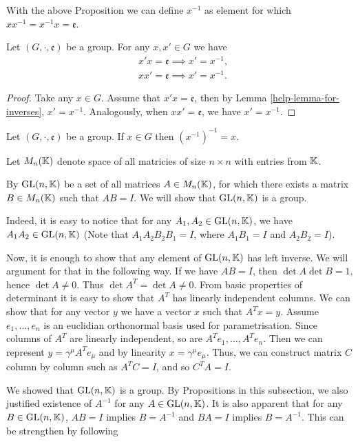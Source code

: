 \documentclass[main.tex]{subfiles}
\begin{document}
With the above Proposition we can define $x^{-1}$ as element for which $xx^{-1} = x^{-1} x = \mathfrak{e}$.

\begin{proposition}
Let $(G, \cdot, \mathfrak{e})$ be a group. For any $x, x'\in G$ we have
\begin{align}
& x'x = \mathfrak{e} \implies x' = x^{-1},\\
& xx' = \mathfrak{e} \implies x' = x^{-1}.
\end{align}
\end{proposition}
\begin{proof}
Take any $x\in G$. Assume that $x' x = \mathfrak{e}$, then by Lemma \ref{help-lemma-for-inverses}, $x' = x^{-1}$. Analogously, when $x x' = \mathfrak{e}$, we have $x' = x^{-1}$.
\end{proof}

\begin{corollary}
\label{group-invers-of-invers}
Let $(G, \cdot, \mathfrak{e})$ be a group. If $x\in G$ then $(x^{-1})^{-1} = x$.
\end{corollary}
Let $M_n(\mathbb{K})$ denote space of all matricies of size $n\times n$ with entries from $\mathbb{K}$.

By $\text{GL}(n, \mathbb{K})$ be a set of all matrices $A \in M_n(\mathbb{K})$, for which there exists a matrix $B\in M_n(\mathbb{K})$ such that $AB = I$. We will show that $\text{GL}(n, \mathbb{K})$ is a group.

Indeed, it is easy to notice that for any $A_1, A_2\in \text{GL}(n, \mathbb{K})$, we have $A_1A_2\in \text{GL}(n, \mathbb{K})$ (Note that $A_1 A_2 B_2 B_1 = I$, where $A_1B_1 = I$ and $A_2B_2 = I$).

Now, it is enough to show that any element of $\text{GL}(n, \mathbb{K})$ has left inverse. We will argument for that in the following way. If we have $AB = I$, then $\det A \det B = 1$, hence $\det A\not = 0$. Thus $\det A^T = \det A \not = 0$. From basic properties of determinant it is easy to show that $A^T$ has linearly independent columns. We can show that for any vector $y$ we have a vector $x$ such that $A^T x = y$. Assume $e_1, \dots, e_n$ is an euclidian orthonormal basis used for parametrisation. Since columns of $A^T$ are linearly independent, so are $A^T e_1, \dots, A^T e_n$. Then we can represent $y = \gamma^\mu A^T e_\mu$ and by linearity $x = \gamma^\mu e_\mu$. Thus, we can construct matrix $C$ column by column such as $A^T C = I$, and so $C^T A = I$.

We showed that $\text{GL}(n, \mathbb{K})$ is a group. By Propositions in this subsection, we also justified existence of $A^{-1}$ for any $A\in \text{GL}(n, \mathbb{K})$. It is also apparent that for any $B\in \text{GL}(n, \mathbb{K})$, $AB = I$ implies $B = A^{-1}$ and $BA = I$ implies $B = A^{-1}$. This can be strengthen by following
\end{document}
